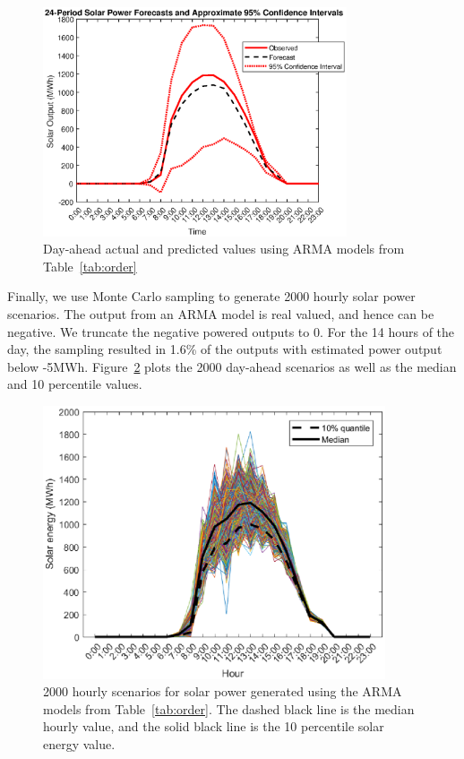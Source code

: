 \documentclass[review]{elsarticle}
\begin{document}
\begin{figure}[!t]
\centering
\includegraphics[width=0.8\textwidth]{prediction.eps}
\caption{Day-ahead actual and predicted values using ARMA models from 
Table~\ref{tab:order}}
 \label{fig:prediction}
\end{figure}

Finally, we use Monte Carlo sampling to generate 2000 hourly solar power 
scenarios. The output from an ARMA model is real valued, and hence can be 
negative. We truncate the negative powered outputs to 0. For the 14 hours of 
the day, the sampling resulted in 1.6\% of the outputs with estimated power 
output below -5MWh. Figure~\ref{fig:sample} plots the 2000 day-ahead scenarios 
as well as the median and 10 percentile values. 


\begin{figure}[!t]
\centering
\includegraphics[width=0.9\textwidth]{sample_smooth.eps}
\caption{2000 hourly scenarios for solar power generated using the ARMA models 
from Table~\ref{tab:order}. The dashed black line is the median hourly value, 
and the solid black line is
the 10 percentile solar energy value.}
 \label{fig:sample}
\end{figure}
\end{document}
